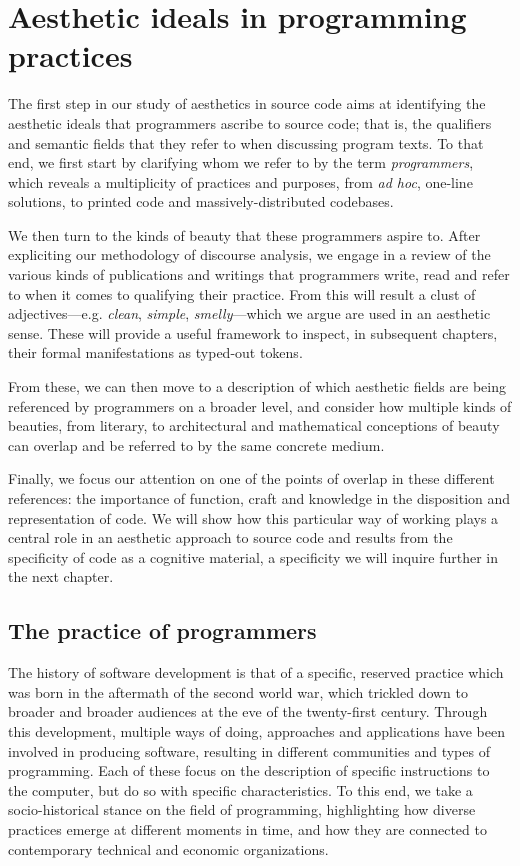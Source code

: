 \chapter{Aesthetic ideals in programming practices}

The first step in our study of aesthetics in source code aims at identifying the aesthetic ideals that programmers ascribe to source code; that is, the qualifiers and semantic fields that they refer to when discussing program texts. To that end, we first start by clarifying whom we refer to by the term \emph{programmers}, which reveals a multiplicity of practices and purposes, from \emph{ad hoc}, one-line solutions, to printed code and massively-distributed codebases.

We then turn to the kinds of beauty that these programmers aspire to. After expliciting our methodology of discourse analysis, we engage in a review of the various kinds of publications and writings that programmers write, read and refer to when it comes to qualifying their practice. From this will result a clust of adjectives—e.g. \emph{clean}, \emph{simple}, \emph{smelly}—which we argue are used in an aesthetic sense. These will provide a useful framework to inspect, in subsequent chapters, their formal manifestations as typed-out tokens.

From these, we can then move to a description of which aesthetic fields are being referenced by programmers on a broader level, and consider how multiple kinds of beauties, from literary, to architectural and mathematical conceptions of beauty can overlap and be referred to by the same concrete medium.

Finally, we focus our attention on one of the points of overlap in these different references: the importance of function, craft and knowledge in the disposition and representation of code. We will show how this particular way of working  plays a central role in an aesthetic approach to source code and results from the specificity of code as a cognitive material, a specificity we will inquire further in the next chapter.

\pagebreak

\section{The practice of programmers}

The history of software development is that of a specific, reserved practice which was born in the aftermath of the second world war, which trickled down to broader and broader audiences at the eve of the twenty-first century. Through this development, multiple ways of doing, approaches and applications have been involved in producing software, resulting in different communities and types of programming. Each of these focus on the description of specific instructions to the computer, but do so with specific characteristics. To this end, we take a socio-historical stance on the field of programming, highlighting how diverse practices emerge at different moments in time, and how they are connected to contemporary technical and economic organizations.


